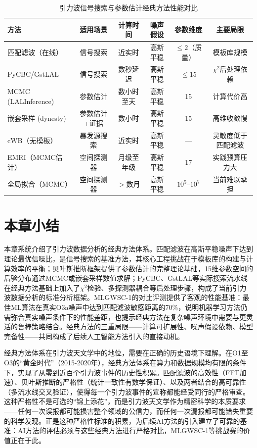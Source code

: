 \begin{table}[htbp]
\centering
\caption{引力波信号搜索与参数估计经典方法性能对比}
\label{tab:classical_methods}
\small
\begin{tabular}{lccccc}
\hline
\textbf{方法} & \textbf{适用场景} & \textbf{计算时间} & \textbf{噪声假设} & \textbf{参数维度} & \textbf{主要局限} \\
\hline
匹配滤波（在线） & 信号搜索 & 近实时 & 高斯平稳 & $\leq 2$（质量） & 模板库规模 \\
PyCBC/GstLAL & 信号搜索 & 数秒延迟 & 高斯平稳 & $\leq 15$ & $\chi^2$后处理依赖 \\
MCMC (LALInference) & 参数估计 & 数小时至天 & 高斯平稳 & 15 & 计算代价高 \\
嵌套采样 (dynesty) & 参数估计+证据 & 数小时 & 高斯平稳 & 15 & 高维收敛慢 \\
cWB（无模板） & 暴发源搜索 & 近实时 & 高斯平稳 & — & 灵敏度低于匹配滤波 \\
\hline
EMRI（MCMC估计） & 空间探测器 & 月级至年级 & 高斯平稳 & 17 & 实践预算压力大 \\
全局拟合（MCMC） & 空间探测器 & $>$数月 & 高斯平稳 & $10^5$--$10^7$ & 当前难以承担 \\
\hline
\end{tabular}
\end{table}

\section{本章小结}

本章系统介绍了引力波数据分析的经典方法体系。匹配滤波在高斯平稳噪声下达到理论最优信噪比，是信号搜索的基准方法，其核心工程挑战在于模板库的构建与计算效率的平衡；贝叶斯推断框架提供了参数估计的完整理论基础，15维参数空间的后验分布通过MCMC或嵌套采样数值求解；PyCBC、GstLAL等实际搜索流水线在经典方法基础上加入了$\chi^2$检验、多探测器耦合等后处理步骤，构成了当前引力波数据分析的标准分析框架。MLGWSC-1的对比评测提供了客观的性能基准：最佳ML算法在真实O3a噪声中达到匹配滤波敏感距离的70\%，说明机器学习方法仍需弥合真实噪声条件下的性能差距，也提示经典方法在复杂噪声环境中需要与更灵活的鲁棒策略结合。经典方法的三重局限——计算可扩展性、噪声假设依赖、模型完备性——共同构成了后续人工智能方法引入的直接动机。

经典方法体系在引力波天文学中的地位，需要在正确的历史语境下理解。在O1至O3的“黄金时代”（2015-2020年），经典方法体系在算力和数据规模均有限的条件下，实现了从零到近百个引力波事件的历史性积累。匹配滤波的高效性（FFT加速）、贝叶斯推断的严格性（统计一致性有数学保证）、以及两者结合的高可靠性（多流水线交叉验证），使得每一个引力波事件的宣称都能经受同行的严格审查。这种严格性不是可选的“锦上添花”，而是引力波天文学作为精密科学的本质要求——任何一次误报都可能损害整个领域的公信力，而任何一次漏报都可能错失重要的科学发现。正是这种严格性标准的积累，为后续AI方法的引入建立了可靠的基准：AI方法的评估必须与这些经典方法进行严格对比，MLGWSC-1等挑战赛的价值正在于此。

